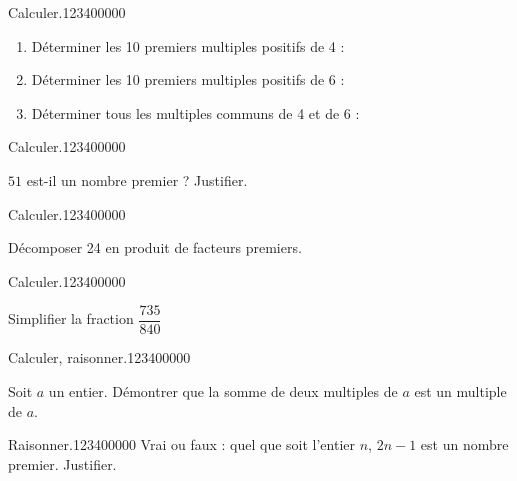 \begin{pageAD} 
 


\begin{ExoCad}{Calculer.}{1234}{0}{0}{0}{0}{0}
\begin{enumerate}
\item Déterminer les 10 premiers multiples positifs de 4 : 
\item Déterminer les 10 premiers multiples positifs de 6 : 
\item Déterminer tous les multiples communs de 4 et de 6 : 
\end{enumerate}
\end{ExoCad}


\begin{ExoCad}{Calculer.}{1234}{0}{0}{0}{0}{0}

$51$ est-il un nombre premier ? Justifier. 


\end{ExoCad}


\begin{ExoCad}{Calculer.}{1234}{0}{0}{0}{0}{0}

Décomposer 24 en produit de facteurs premiers.


\end{ExoCad}



\begin{ExoCad}{Calculer.}{1234}{0}{0}{0}{0}{0}

Simplifier la fraction $\dfrac{735}{840}$ 


\end{ExoCad}



\begin{ExoCad}{Calculer, raisonner.}{1234}{0}{0}{0}{0}{0}

Soit $a$ un entier. Démontrer que la somme de deux multiples de $a$ est un multiple de $a$. 

\end{ExoCad}


\begin{ExoCad}{Raisonner.}{1234}{0}{0}{0}{0}{0}
Vrai ou faux : quel que soit l'entier $n$, $2n-1$ est un nombre premier. Justifier.
\end{ExoCad}



\end{pageAD}
